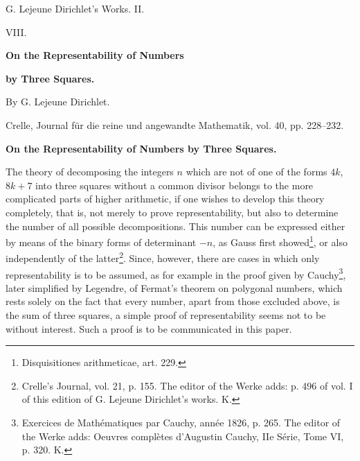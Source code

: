 \documentclass[11pt]{article}
\begin{document}
\begin{center}
{\Large G. Lejeune Dirichlet's Works. II.}\par\vspace{1.2em}
{\Large VIII.}\par\vspace{0.5em}
{\LARGE \textbf{On the Representability of Numbers}}\par
{\LARGE \textbf{by Three Squares.}}\par\vspace{1em}
{\large By G. Lejeune Dirichlet.}\par\vspace{0.5em}
{\small Crelle, Journal für die reine und angewandte Mathematik, vol. 40, pp. 228--232.}
\end{center}

\begin{center}
{\large \textbf{On the Representability of Numbers by Three Squares.}}
\end{center}

The theory of decomposing the integers $n$ which are not of one of the forms $4k$, $8k+7$ into three squares without a common divisor belongs to the more complicated parts of higher arithmetic, if one wishes to develop this theory completely, that is, not merely to prove representability, but also to determine the number of all possible decompositions. This number can be expressed either by means of the binary forms of determinant $-n$, as Gauss first showed\footnote{Disquisitiones arithmeticae, art. 229.}, or also independently of the latter\footnote{Crelle's Journal, vol. 21, p. 155. The editor of the Werke adds: p. 496 of vol. I of this edition of G. Lejeune Dirichlet's works. K.}. Since, however, there are cases in which only representability is to be assumed, as for example in the proof given by Cauchy\footnote{Exercices de Mathématiques par Cauchy, année 1826, p. 265. The editor of the Werke adds: Oeuvres complètes d'Augustin Cauchy, IIe Série, Tome VI, p. 320. K.}, later simplified by Legendre, of Fermat's theorem on polygonal numbers, which rests solely on the fact that every number, apart from those excluded above, is the sum of three squares, a simple proof of representability seems not to be without interest. Such a proof is to be communicated in this paper.
\end{document}
